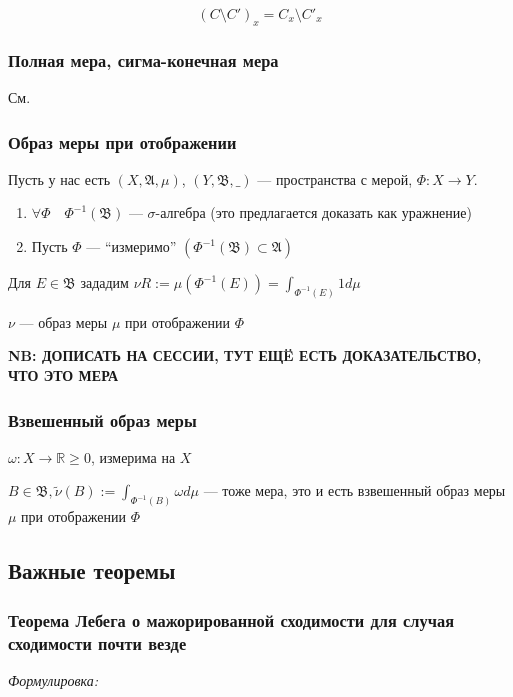 \documentclass{article}
\begin{document}
\[\left(C \setminus C'\right)_{x} = C_{x} \setminus C'_{x}\]

\subsubsection{Полная мера, сигма-конечная мера}

См. \href{http://gg.gg/holykpksem3}{\color{blue}{конспект прошлого семестра}}

\subsubsection{Образ меры при отображении}

Пусть у нас есть $(X, \mathfrak{A}, \mu)$, $(Y, \mathfrak{B}, \_ )$ --- пространства с мерой, $\Phi: X \rightarrow Y$.

\begin{enumerate}
    \item $\forall \Phi \quad \Phi^{-1}(\mathfrak{B})$ --- $\sigma$-алгебра (это предлагается доказать как уражнение)
    \item Пусть $\Phi$ --- ``измеримо'' $\left(\Phi^{-1}(\mathfrak{B}) \subset \mathfrak{A}\right)$
\end{enumerate}

Для $E \in \mathfrak{B}$ зададим $\nu R := \mu\left(\Phi^{-1}(E)\right) = \int_{\Phi^{-1}(E)} 1 d \mu$

$\nu$ --- образ меры $\mu$ при отображении $\Phi$

\textbf{NB: ДОПИСАТЬ НА СЕССИИ, ТУТ ЕЩË ЕСТЬ ДОКАЗАТЕЛЬСТВО, ЧТО ЭТО МЕРА}

\subsubsection{Взвешенный образ меры}

$\omega: X \rightarrow \mathbb{R} \ge 0$, измерима на $X$

$B \in \mathfrak{B}, \tilde{\nu}(B) := \int_{\Phi^{-1}(B)} \omega d\mu$ --- тоже мера, это и есть взвешенный образ меры $\mu$ при отображении $\Phi$

\newpage

\subsection{Важные теоремы}

\subsubsection{Теорема Лебега о мажорированной сходимости для случая сходимости почти везде}
\textit{Формулировка:}
\end{document}
